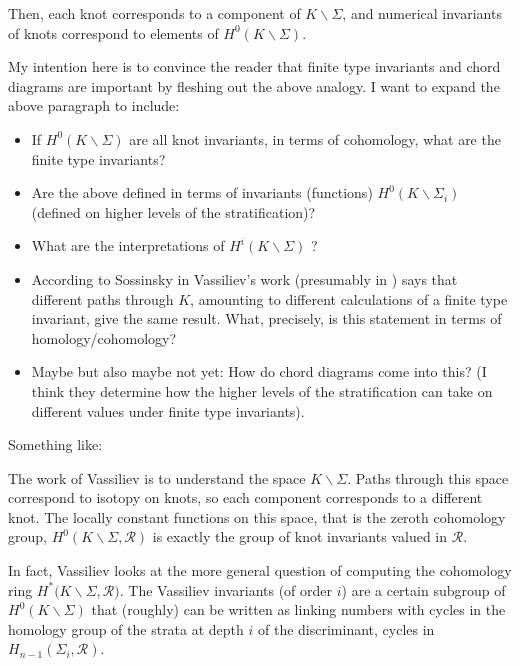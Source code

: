 \documentclass[12pt]{report}
\theoremstyle{regular}
\newcommand{\draftnote}[1]{
\begin{mdframed}[style=draftnote]
        {\color{Gray}{\scshape Note:} #1 }
\end{mdframed}
}
\begin{document}
        Then, each knot corresponds to a component of \(K \smallsetminus \Sigma\), and numerical invariants of knots correspond to elements of \(H^{0}(K \smallsetminus \Sigma)\).
        \draftnote{
                My intention here is to convince the reader that finite type invariants and chord diagrams are important by fleshing out the above analogy. I want to expand the above paragraph to include:
                \begin{itemize}
                        \item If \(H^{0}(K \smallsetminus \Sigma)\) are all knot invariants, in terms of cohomology, what are the finite type invariants?
                        \item Are the above defined in terms of invariants (functions) \(H^{0}(K \smallsetminus \Sigma_{i})\) (defined on higher levels of the stratification)?
                        \item What are the interpretations of \(H^{i}(K \smallsetminus \Sigma)\) \cite[p.149]{complements-of-discriminants-of-smooth-maps-topology-and-applications}?
                        \item According to Sossinsky in \cite[p. 49]{knots-mathematics-with-a-twist} Vassiliev's work (presumably in \cite{complements-of-discriminants-of-smooth-maps-topology-and-applications, cohomology-of-knot-spaces}) says that different paths through \(K\), amounting to different calculations of a finite type invariant, give the same result. What, precisely, is this statement in terms of homology/cohomology?
                        \item Maybe but also maybe not yet: How do chord diagrams come into this? (I think they determine how the higher levels of the stratification can take on different values under finite type invariants).
                \end{itemize}

                Something like:
        }

        The work of Vassiliev is to understand the space
        \(K \smallsetminus \Sigma\).
        Paths through this space correspond to isotopy on knots, so each component corresponds to a different knot. The locally constant functions on this space, that is the zeroth cohomology group,
        \({H^{0}(K \smallsetminus \Sigma, \mathcal{R})}\)
        is exactly the group of knot invariants valued in
        \(\mathcal{R}\).

        In fact, Vassiliev looks at the more general question of computing the cohomology ring
        \({H^{\ast}(K \smallsetminus \Sigma, \mathcal{R}})\).
        The Vassiliev invariants (of order \(i\)) are a certain subgroup of
        \({H^{0}(K \smallsetminus \Sigma)}\)
        that (roughly) can be written as linking numbers with cycles in the homology group of the strata at depth \(i\) of the discriminant, cycles in
        \({H_{n - 1}(\Sigma_{i}, \mathcal{R})}\).
\end{document}
